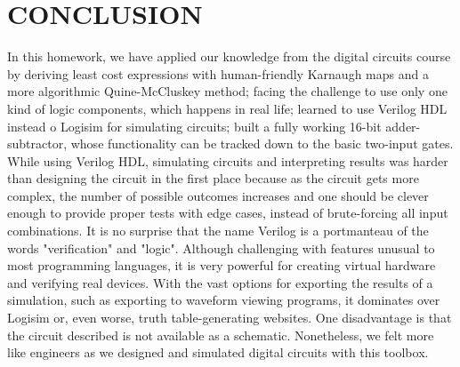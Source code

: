 \documentclass[pdftex,12pt,a4paper]{article}
\begin{document}
\section{CONCLUSION}
In this homework, we have applied our knowledge from the digital circuits course by deriving least cost expressions with human-friendly Karnaugh maps and a more algorithmic Quine-McCluskey method; facing the challenge to use only one kind of logic components, which happens in real life; learned to use Verilog HDL instead o Logisim for simulating circuits; built a fully working 16-bit adder-subtractor, whose functionality can be tracked down to the basic two-input gates. While using  Verilog HDL, simulating circuits and interpreting results was harder than designing the circuit in the first place because as the circuit gets more complex, the number of possible outcomes increases and one should be clever enough to provide proper tests with edge cases, instead of brute-forcing all input combinations. It is no surprise that the name Verilog is a portmanteau of the words "verification" and "logic". Although challenging with features unusual to most programming languages, it is very powerful for creating virtual hardware and verifying real devices. With the vast options for exporting the results of a simulation, such as exporting to waveform viewing programs, it dominates over Logisim or, even worse, truth table-generating websites. One disadvantage is that the circuit described is not available as a schematic. Nonetheless, we felt more like engineers as we designed and simulated digital circuits with this toolbox.

\newpage


\end{document}
